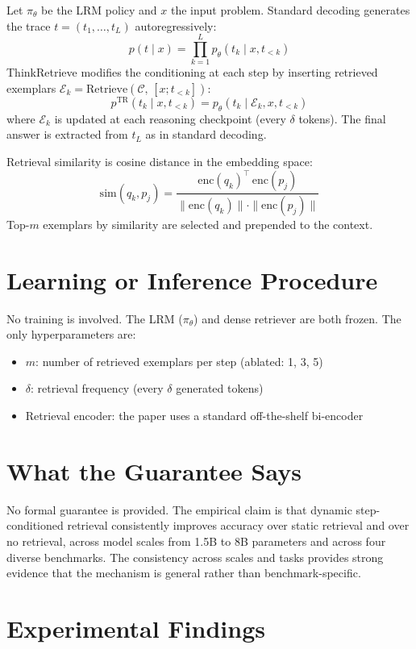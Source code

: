 \documentclass[10pt,twocolumn]{article}
\begin{document}
Let $\pi_\theta$ be the LRM policy and $x$ the input problem. Standard decoding
generates the trace $t = (t_1, \ldots, t_L)$ autoregressively:
\[
p(t \mid x) = \prod_{k=1}^L p_\theta(t_k \mid x, t_{<k})
\]
ThinkRetrieve modifies the conditioning at each step by inserting retrieved
exemplars $\mathcal{E}_k = \mathrm{Retrieve}(\mathcal{C},\, [x; t_{<k}])$:
\[
p^{\mathrm{TR}}(t_k \mid x, t_{<k}) = p_\theta(t_k \mid \mathcal{E}_k, x, t_{<k})
\]
where $\mathcal{E}_k$ is updated at each reasoning checkpoint (every $\delta$ tokens).
The final answer is extracted from $t_L$ as in standard decoding.

Retrieval similarity is cosine distance in the embedding space:
\[
\mathrm{sim}(q_k, p_j) = \frac{\mathrm{enc}(q_k)^\top\, \mathrm{enc}(p_j)}{\|\mathrm{enc}(q_k)\| \cdot \|\mathrm{enc}(p_j)\|}
\]
Top-$m$ exemplars by similarity are selected and prepended to the context.

\section{Learning or Inference Procedure}

No training is involved. The LRM ($\pi_\theta$) and dense retriever are both
frozen. The only hyperparameters are:
\begin{itemize}[itemsep=2pt,parsep=0pt]
  \item $m$: number of retrieved exemplars per step (ablated: 1, 3, 5)
  \item $\delta$: retrieval frequency (every $\delta$ generated tokens)
  \item Retrieval encoder: the paper uses a standard off-the-shelf bi-encoder
\end{itemize}

\section{What the Guarantee Says}

No formal guarantee is provided. The empirical claim is that dynamic step-conditioned
retrieval consistently improves accuracy over static retrieval and over no retrieval,
across model scales from 1.5B to 8B parameters and across four diverse benchmarks.
The consistency across scales and tasks provides strong evidence that the mechanism
is general rather than benchmark-specific.

\section{Experimental Findings}
\end{document}
